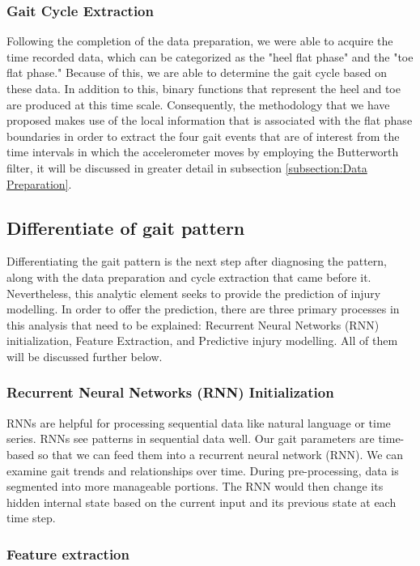 \subsubsection{Gait Cycle Extraction}
Following the completion of the data preparation, we were able to acquire the time recorded data, which can be categorized as the "heel flat phase" and the "toe flat phase." Because of this, we are able to determine the gait cycle based on these data. In addition to this, binary functions that represent the heel and toe are produced at this time scale. Consequently, the methodology that we have proposed makes use of the local information that is associated with the flat phase boundaries in order to extract the four gait events that are of interest from the time intervals in which the accelerometer moves by employing the Butterworth filter, it will be discussed in greater detail in subsection \ref{subsection:Data Preparation}.

\subsection{Differentiate of gait pattern}

Differentiating the gait pattern is the next step after diagnosing the pattern, along with the data preparation and cycle extraction that came before it. Nevertheless, this analytic element seeks to provide the prediction of injury modelling. In order to offer the prediction, there are three primary processes in this analysis that need to be explained: Recurrent Neural Networks (RNN) initialization, Feature Extraction, and Predictive injury modelling. All of them will be discussed further below.

\subsubsection{Recurrent Neural Networks (RNN) Initialization}

RNNs are helpful for processing sequential data like natural language or time series. RNNs see patterns in sequential data well. Our gait parameters are time-based so that we can feed them into a recurrent neural network (RNN). We can examine gait trends and relationships over time. During pre-processing, data is segmented into more manageable portions. The RNN would then change its hidden internal state based on the current input and its previous state at each time step.

\subsubsection{Feature extraction}

